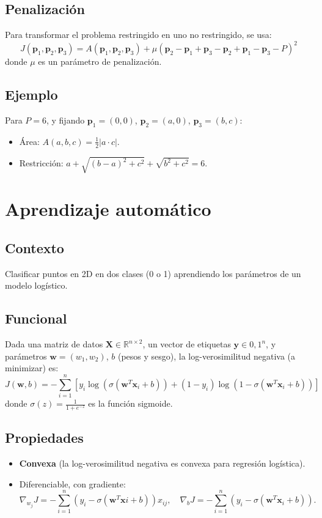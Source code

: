 \documentclass[12pt]{book}
\theoremstyle{definition}
\theoremstyle{plain}
\theoremstyle{remark}
\begin{document}
\subsection{Penalización}
Para transformar el problema restringido en uno no restringido, se usa:
$$
J(\mathbf{p}_1, \mathbf{p}_2, \mathbf{p}_3) = A(\mathbf{p}_1, \mathbf{p}_2, \mathbf{p}_3) + \mu \left( \mathbf{p}_2 - \mathbf{p}_1 + \mathbf{p}_3 - \mathbf{p}_2 + \mathbf{p}_1 - \mathbf{p}_3 - P \right)^2
$$
donde $ \mu $ es un parámetro de penalización.

\subsection{Ejemplo}
Para $ P = 6 $, y fijando $ \mathbf{p}_1 = (0, 0) $, $ \mathbf{p}_2 = (a, 0) $, $ \mathbf{p}_3 = (b, c) $:
\begin{itemize}
    \item Área:
    $
    A(a, b, c) = \frac{1}{2} |a \cdot c|.
    $
    \item Restricción:
    $
    a + \sqrt{(b - a)^2 + c^2} + \sqrt{b^2 + c^2} = 6.
    $
\end{itemize}

\section{Aprendizaje automático} %
\subsection{Contexto}
Clasificar puntos en 2D en dos clases (0 o 1) aprendiendo los parámetros de un modelo logístico.

\subsection{Funcional}
Dada una matriz de datos $ \mathbf{X} \in \mathbb{R}^{n \times 2} $, un vector de etiquetas $ \mathbf{y} \in 0, 1^n $, y parámetros $ \mathbf{w} = (w_1, w_2) $, $ b $ (pesos y sesgo), la log-verosimilitud negativa (a minimizar) es:
$$
J(\mathbf{w}, b) = -\sum_{i=1}^n \left[ y_i \log(\sigma(\mathbf{w}^T \mathbf{x}_i + b)) + (1 - y_i) \log(1 - \sigma(\mathbf{w}^T \mathbf{x}_i + b)) \right]
$$
donde $ \sigma(z) = \frac{1}{1 + e^{-z}} $ es la función sigmoide.

\subsection{Propiedades}
\begin{itemize}
    \item \textbf{Convexa} (la log-verosimilitud negativa es convexa para regresión logística).
    \item Diferenciable, con gradiente:
    $$
    \nabla_{w_j} J = -\sum_{i=1}^n (y_i - \sigma(\mathbf{w}^T \mathbf{x}i + b)) x_{ij}, \quad \nabla_b J = -\sum_{i=1}^n (y_i - \sigma(\mathbf{w}^T \mathbf{x}_i + b)).
    $$
\end{itemize}
\end{document}
